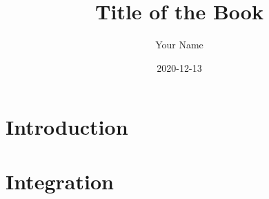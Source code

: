 \documentclass{memoir}
\title{Title of the Book}
\date{2020-12-13}
\author{Your Name}
\begin{document}
\frontmatter
{}
\maketitle
\newpage
\tableofcontents
\newpage
\listoffigures
\newpage
\listoftables
\newpage
\lstlistoflistings


\mainmatter
\part{Introduction}


\part{Integration}
%
%

\appendix
%
%

\backmatter
\printglossary[type=\acronymtype]
\printglossary


\printindex
\end{document}
